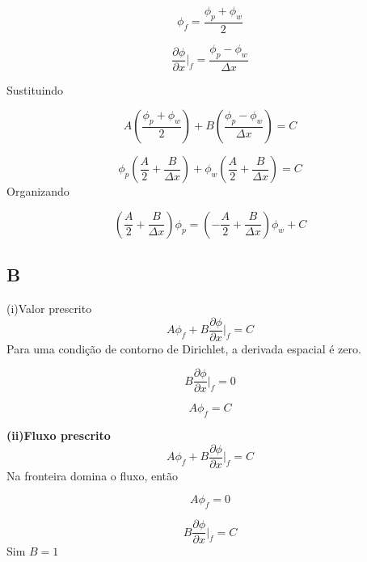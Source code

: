 \documentclass[]{article}
\begin{document}
\begin{equation}
	 \phi_f= \frac{\phi_p + \phi_w}{2}
\end{equation}

\begin{equation}
	{\frac{\partial\phi}{\partial x}}\bigg|_f =  \frac{\phi_p - \phi_w}{\Delta x}
\end{equation}

Sustituindo

\begin{equation}
	A (\frac{\phi_p + \phi_w}{2}) + B (\frac{\phi_p - \phi_w}{\Delta x}) = C
\end{equation}

\begin{equation}
	\phi_p (\frac{A}{2} + \frac{B}{\Delta x}) + \phi_w (\frac{A}{2} + \frac{B}{\Delta x}) = C
\end{equation}
Organizando

\begin{equation}
	(\frac{A}{2} + \frac{B}{\Delta x}) \phi_p  = (-\frac{A}{2} + \frac{B}{\Delta x}) \phi_w + C
\end{equation}


\subsection*{B}

(i)Valor prescrito 
\begin{equation}
	A \phi_f + B \frac{\partial \phi}{\partial x} \bigg|_f = C
\end{equation}
Para uma condição de contorno de Dirichlet, a derivada espacial é zero.

\begin{equation}
	B \frac{\partial \phi}{\partial x} \bigg|_f = 0
\end{equation}

\begin{equation}
	A \phi_f = C
\end{equation}


\textbf{(ii)Fluxo prescrito}
\begin{equation}
	A \phi_f + B \frac{\partial \phi}{\partial x} \bigg|_f = C
\end{equation}
Na fronteira domina o fluxo, então

\begin{equation}
	A \phi_f = 0
\end{equation}

\begin{equation}
	B \frac{\partial \phi}{\partial x} \bigg|_f = C
\end{equation}
Sim $B=1$\\
\end{document}
